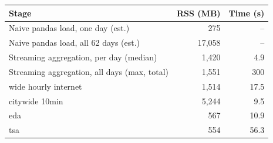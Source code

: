 \begin{tabular}{p{4.6cm} rr}
\toprule
Stage & RSS (MB) & Time (s) \\
\midrule
Naive pandas load, one day (est.) & 275 & -- \\
Naive pandas load, all 62 days (est.) & 17,058 & -- \\
Streaming aggregation, per day (median) & 1,420 & 4.9 \\
Streaming aggregation, all days (max, total) & 1,551 & 300 \\
wide hourly internet & 1,514 & 17.5 \\
citywide 10min & 5,244 & 9.5 \\
eda & 567 & 10.9 \\
tsa & 554 & 56.3 \\
\bottomrule
\end{tabular}
